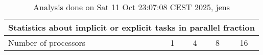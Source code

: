\begin{table}[h]
\begin{center}
\begin{tabular}{|l|c|c|c|c|}
\hline
\multicolumn{5}{|c|}{Statistics about implicit or explicit tasks in parallel fraction} \\
\hline
\hline
Number of processors & 1 & 4 & 8 & 16 \\
\hline
\hline
\end{tabular}
\end{center}
\caption{ Analysis done on Sat 11 Oct 23:07:08 CEST 2025, jens}
\end{table}
